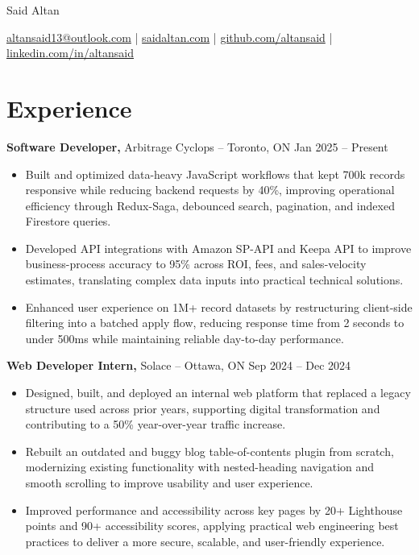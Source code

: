 \documentclass[11pt]{article}       %
\begin{document}
\centerline{\Huge Said Altan}

\vspace{10pt}

\centerline{\href{mailto:altansaid13@outlook.com}{altansaid13@outlook.com} | \href{https://saidaltan.com}{saidaltan.com} | \href{https://github.com/altansaid}{github.com/altansaid} | \href{https://www.linkedin.com/in/altansaid}{linkedin.com/in/altansaid}}


\vspace{5pt}
\section*{Experience}
\textbf{Software Developer,} {Arbitrage Cyclops} -- Toronto, ON \hfill Jan 2025 -- Present \\
\vspace{-9pt}
\begin{itemize}
  \item Built and optimized data-heavy JavaScript workflows that kept 700k records responsive while reducing backend requests by 40\%, improving operational efficiency through Redux-Saga, debounced search, pagination, and indexed Firestore queries.
  \item Developed API integrations with Amazon SP-API and Keepa API to improve business-process accuracy to 95\% across ROI, fees, and sales-velocity estimates, translating complex data inputs into practical technical solutions.
  \item Enhanced user experience on 1M+ record datasets by restructuring client-side filtering into a batched apply flow, reducing response time from 2 seconds to under 500ms while maintaining reliable day-to-day performance.
\end{itemize}

\textbf{Web Developer Intern,} {Solace} -- Ottawa, ON \hfill Sep 2024 -- Dec 2024 \\
\vspace{-9pt}
\begin{itemize}
  \item Designed, built, and deployed an internal web platform that replaced a legacy structure used across prior years, supporting digital transformation and contributing to a 50\% year-over-year traffic increase.
  \item Rebuilt an outdated and buggy blog table-of-contents plugin from scratch, modernizing existing functionality with nested-heading navigation and smooth scrolling to improve usability and user experience.
  \item Improved performance and accessibility across key pages by 20+ Lighthouse points and 90+ accessibility scores, applying practical web engineering best practices to deliver a more secure, scalable, and user-friendly experience.
\end{itemize}
\end{document}
